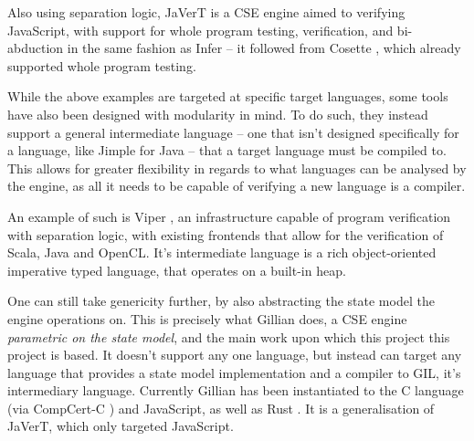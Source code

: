 Also using separation logic, JaVerT \cite{javert1, javert2} is a CSE engine aimed to verifying JavaScript, with support for whole program testing, verification, and bi-abduction in the same fashion as Infer -- it followed from Cosette \cite{cosette}, which already supported whole program testing.

While the above examples are targeted at specific target languages, some tools have also been designed with modularity in mind. To do such, they instead support a general intermediate language -- one that isn't designed specifically for a language, like Jimple for Java -- that a target language must be compiled to. This allows for greater flexibility in regards to what languages can be analysed by the engine, as all it needs to be capable of verifying a new language is a compiler. 

An example of such is Viper \cite{viper}, an infrastructure capable of program verification with separation logic, with existing frontends that allow for the verification of Scala, Java and OpenCL. It's intermediate language is a rich object-oriented imperative typed language, that operates on a built-in heap.

One can still take genericity further, by also abstracting the state model the engine operations on. This is precisely what Gillian \cite{gillian0, gillian1, gillian2} does, a CSE engine \emph{parametric on the state model}, and the main work upon which this project this project is based. It doesn't support any one language, but instead can target any language that provides a state model implementation and a compiler to GIL, it's intermediary language. Currently Gillian has been instantiated to the C language (via CompCert-C \cite{compcert}) and JavaScript, as well as Rust \cite{gillianrust}. It is a generalisation of JaVerT, which only targeted JavaScript.

